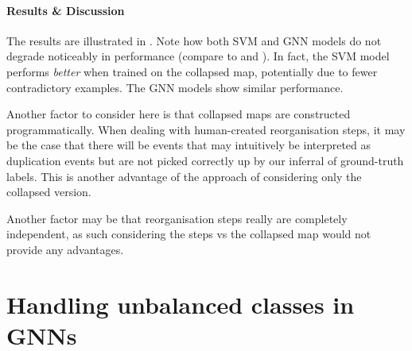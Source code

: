 \documentclass[
	fontsize=10pt, %
	twoside=false, %
	secnumdepth=1, %
  toc=indentunnumbered %
]{kaobook}
\begin{document}
\paragraph{Results \& Discussion} The results are illustrated in
. Note how both SVM and GNN models do
not degrade noticeably in performance (compare to
 and ). In
fact, the SVM model performs \textit{better} when trained on the collapsed map,
potentially due to fewer contradictory examples. The GNN models show similar
performance.


Another factor to consider here is that collapsed maps are constructed
programmatically. When dealing with human-created reorganisation steps, it may
be the case that there will be events that may intuitively be interpreted as
duplication events but are not picked correctly up by our inferral of
ground-truth labels. This is another advantage of the approach of considering
only the collapsed version.

Another factor may be that reorganisation steps really are completely
independent, as such considering the steps vs the collapsed map would not
provide any advantages.








\section{Handling unbalanced classes in GNNs}
\end{document}
